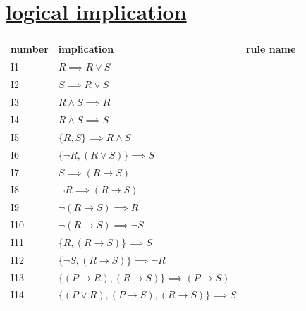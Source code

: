 \documentclass[a4paper,12pt]{article}
\begin{document}
\section{\href{20230525090605-logical_implication.org}{logical implication}}
\label{sec:orge87e56f}
\begin{tabular}{lll}
number & implication & rule name\\
\hline
I1 & \(R \implies R \lor S\) & \\
I2 & \(S \implies R \lor S\) & \\
I3 & \(R \land S \implies R\) & \\
I4 & \(R \land S \implies S\) & \\
I5 & \(\{R,S\} \implies R \land S\) & \\
I6 & \(\{\lnot R, (R \lor S)\} \implies S\) & \\
I7 & \(S \implies (R \to S)\) & \\
I8 & \(\lnot R \implies (R \to S)\) & \\
I9 & \(\lnot (R \to S) \implies R\) & \\
I10 & \(\lnot (R \to S) \implies \lnot S\) & \\
I11 & \(\{R,(R \to S)\} \implies S\) & \\
I12 & \(\{\lnot S, (R \to S)\} \implies \lnot R\) & \\
I13 & \(\{(P \to R),(R \to S)\} \implies (P \to S)\) & \\
I14 & \(\{(P \lor R),(P \to S),(R \to S)\} \implies S\) & \\
\end{tabular}
\end{document}
